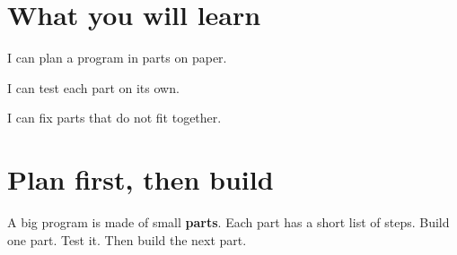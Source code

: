 
\section{What you will learn}
\begin{ican}
  \item I can plan a program in parts on paper.
  \item I can test each part on its own.
  \item I can fix parts that do not fit together.
\end{ican}

\section{Plan first, then build}
A big program is made of small \textbf{parts}. Each part has a short list of steps. Build one part. Test it. Then build the next part.

